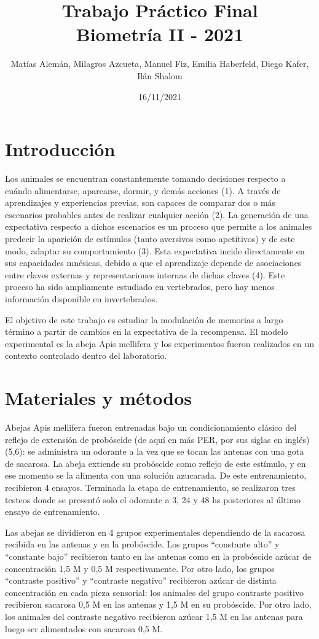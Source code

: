\documentclass[]{article}
\title{Trabajo Práctico Final\\
Biometría II - 2021}
\author{Matías Alemán, Milagros Azcueta, Manuel Fiz, Emilia Haberfeld, Diego
Kafer, Ilán Shalom}
\date{16/11/2021}
\begin{document}
\maketitle

\hypertarget{introducciuxf3n}{%
\section{Introducción}\label{introducciuxf3n}}

Los animales se encuentran constantemente tomando decisiones respecto a
cuándo alimentarse, aparearse, dormir, y demás acciones (1). A través de
aprendizajes y experiencias previas, son capaces de comparar dos o más
escenarios probables antes de realizar cualquier acción (2). La
generación de una expectativa respecto a dichos escenarios es un proceso
que permite a los animales predecir la aparición de estímulos (tanto
aversivos como apetitivos) y de este modo, adaptar su comportamiento
(3). Esta expectativa incide directamente en sus capacidades mnésicas,
debido a que el aprendizaje depende de asociaciones entre claves
externas y representaciones internas de dichas claves (4). Este proceso
ha sido ampliamente estudiado en vertebrados, pero hay menos información
disponible en invertebrados.

El objetivo de este trabajo es estudiar la modulación de memorias a
largo término a partir de cambios en la expectativa de la recompensa. El
modelo experimental es la abeja Apis mellifera y los experimentos fueron
realizados en un contexto controlado dentro del laboratorio.

\hypertarget{materiales-y-muxe9todos}{%
\section{Materiales y métodos}\label{materiales-y-muxe9todos}}

Abejas Apis mellifera fueron entrenadas bajo un condicionamiento clásico
del reflejo de extensión de probóscide (de aquí en más PER, por sus
siglas en inglés) (5,6): se administra un odorante a la vez que se tocan
las antenas con una gota de sacarosa. La abeja extiende su probóscide
como reflejo de este estímulo, y en ese momento se la alimenta con una
solución azucarada. De este entrenamiento, recibieron 4 ensayos.
Terminada la etapa de entrenamiento, se realizaron tres testeos donde se
presentó solo el odorante a 3, 24 y 48 hs posteriores al último ensayo
de entrenamiento.

Las abejas se dividieron en 4 grupos experimentales dependiendo de la
sacarosa recibida en las antenas y en la probóscide. Los grupos
``constante alto'' y ``constante bajo'' recibieron tanto en las antenas
como en la probóscide azúcar de concentración 1,5 M y 0,5 M
respectivamente. Por otro lado, los grupos ``contraste positivo'' y
``contraste negativo'' recibieron azúcar de distinta concentración en
cada pieza sensorial: los animales del grupo contraste positivo
recibieron sacarosa 0,5 M en las antenas y 1,5 M en su probóscide. Por
otro lado, los animales del contraste negativo recibieron azúcar 1,5 M
en las antenas para luego ser alimentados con sacarosa 0,5 M.
\end{document}
